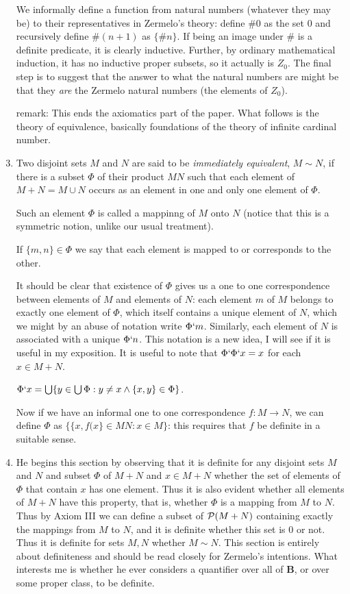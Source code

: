 \documentclass[12pt]{article}
\begin{document}
\begin{enumerate}
We informally define a function from natural numbers (whatever they may be)  to their representatives in Zermelo's theory:  define $\# 0$ as the set $0$ and recursively define
$\# (n+1)$ as $\{\# n\}$.   If being an image under $\#$ is a definite predicate, it is clearly inductive.  Further, by ordinary mathematical induction, it has no inductive proper subsets, so it actually is $Z_0$.  The final step is to suggest that the answer to what the natural numbers are might be that they {\em are\/} the Zermelo natural numbers (the elements of $Z_0$).


\item [remark:]  This ends the axiomatics part of the paper.  What follows is the theory of equivalence, basically foundations of the theory of infinite cardinal number.

\item  Two disjoint sets $M$ and $N$ are said to be {\em immediately equivalent\/}, $M \sim N$, if there is a subset $\Phi$ of their product $MN$ such that each element of
$M+N = M\cup N$ occurs as an element in one and only one element of $\Phi$.

Such an element $\Phi$ is called a mappinng of $M$ onto $N$ (notice that this is a symmetric notion, unlike our usual treatment).

If $\{m,n\} \in \Phi$ we say that each element is mapped to or corresponds to the other.

It should be clear that existence of $\Phi$ gives us a one to one correspondence between elements of $M$ and elements of $N$:  each element $m$ of $M$ belongs to
exactly one element of $\Phi$, which itself contains a unique element of $N$, which we might by an abuse of notation write $\Phi`m$.  Similarly, each element of $N$ is associated with a unique $\Phi`n$.  This notation is a new idea, I will see if it is useful in my exposition.  It is useful to note that $\Phi`\Phi`x=x$ for each $x \in M+N$.

$\Phi`x = \bigcup \{y \in \bigcup \Phi:y \neq x \wedge \{x,y\} \in \Phi\}$.

Now if we have an informal one to one correspondence $f:M \rightarrow N$, we can define $\Phi$ as $\{\{x,f(x\}\in MN: x \in M\}$:  this requires that $f$ be definite in a suitable sense.

\item  He begins this section by observing that it is definite for any disjoint sets $M$ and $N$ and subset $\Phi$ of $M+N$ and $x \in M+N$ whether the set of elements of $\Phi$ that contain $x$ has one element.  Thus it is also evident whether all elements of $M+N$ have this property, that is, whether $\Phi$ is a mapping from $M$ to $N$.  Thus by Axiom III
we can define a subset of ${\cal P}(M+N)$ containing exactly the mappings from $M$ to $N$, and it is definite whether this set is 0 or not.  Thus it is definite for sets $M,N$ whether
$M \sim N$.  This section is entirely about definiteness and should be read closely for Zermelo's intentions.  What interests me is whether he ever considers a quantifier over all
of {\bf B}, or over some proper class, to be definite.


\end{enumerate}
\end{document}
